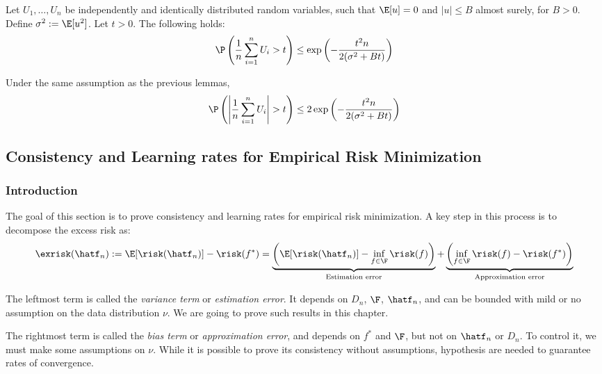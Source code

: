 \documentclass[toc, titlepaged]{../cs-classes/cs-classes}
\begin{document}
\begin{lemma}
    Let $U_1, \dots, U_n$ be independently and identically distributed random variables, such that $\E[u]=0$ and $|u|\leq B$ almost surely, for $B>0$. Define $\sigma^2:=\E[u^2]$. Let $t>0$. The following holds:
    \begin{equation}
        \P\left(\frac{1}{n}\sum_{i=1}^nU_i > t\right) \leq \exp\left(-\frac{t^2n}{2(\sigma^2+Bt)}\right)
    \end{equation}
\end{lemma}

\begin{corollary}
    Under the same assumption as the previous lemmas,
    \begin{equation*}
        \P\left(\left|\frac{1}{n}\sum_{i=1}^nU_i\right|>t\right) \leq 2\exp\left(-\frac{t^2n}{2(\sigma^2+Bt)}\right)
    \end{equation*}
\end{corollary}

\subsection{Consistency and Learning rates for Empirical Risk Minimization}
\subsubsection{Introduction}
The goal of this section is to prove consistency and learning rates for empirical risk minimization. A key step in this process is to decompose the excess risk as:
\begin{equation*}
    \exrisk(\hatf_n) := \E[\risk(\hatf_n)]-\risk(f^*) = 
    \underbrace{\left(
        \E[\risk(\hatf_n)]-\inf_{f\in\F}\risk(f)
    \right)}_{\textnormal{Estimation error}} + 
    \underbrace{\left(
        \inf_{f\in\F}\risk(f)-\risk(f^*)
    \right)}_{\textnormal{Approximation error}}
\end{equation*}

The leftmost term is called the \emph{variance term} or \emph{estimation error}. It depends on $D_n$, $\F$, $\hatf_n$, and can be bounded with mild or no assumption on the data distribution $\nu$. We are going to prove such results in this chapter.

The rightmost term is called the \emph{bias term} or \emph{approximation error}, and depends on $f^*$ and $\F$, but not on $\hatf_n$ or $D_n$. To control it, we must make some assumptions on $\nu$. While it is possible to prove its consistency without assumptions, hypothesis are needed to guarantee rates of convergence.
\end{document}
